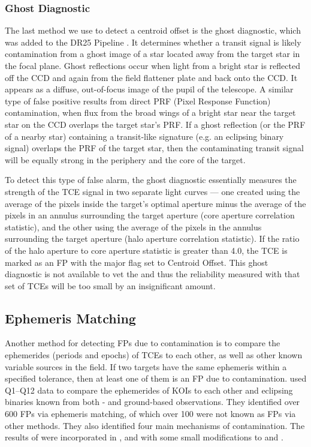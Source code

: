 \subsubsection{Ghost Diagnostic}
\label{s:ghost}
The last method we use to detect a centroid offset is the ghost diagnostic, which was added to the DR25 \kepler{} Pipeline \citep[see \S\,11.3.7 of][]{JenkinsKDPH}. It determines whether a transit signal is likely contamination from a ghost image of a star located away from the target star in the focal plane. Ghost reflections occur when light from a bright star is reflected off the CCD and again from the field flattener plate and back onto the CCD. It appears as a diffuse, out-of-focus image of the pupil of the telescope. A similar type of false positive results from direct PRF (Pixel Response Function) contamination, when flux from the broad wings of a bright star near the target star on the CCD overlaps the target star's PRF.  If a ghost reflection (or the PRF of a nearby star) containing a transit-like signature (e.g. an eclipsing binary signal) overlaps the PRF of the target star, then the contaminating transit signal will be equally strong in the periphery and the core of the target. 

To detect this type of false alarm, the ghost diagnostic essentially measures the strength of the TCE signal in two separate light curves --- one created using the average of the pixels inside the target's optimal aperture minus the average of the pixels in an annulus surrounding the target aperture (core aperture correlation statistic), and the other using the average of the pixels in the annulus surrounding the target aperture (halo aperture correlation statistic). If the ratio of the halo aperture to core aperture statistic is greater than 4.0, the TCE is marked as an FP with the major flag set to Centroid Offset. This ghost diagnostic is not available to vet the  and thus the reliability measured with that set of TCEs will be too small by an insignificant amount.



\subsection{Ephemeris Matching}
\label{ephemmatchsec}
\label{s:ephemmatch}

Another method for detecting FPs due to contamination is to compare the ephemerides (periods and epochs) of TCEs to each other, as well as other known variable sources in the \kepler{} field. If two targets have the same ephemeris within a specified tolerance, then at least one of them is an FP due to contamination. \citet{Coughlin2014a} used Q1--Q12 data to compare the ephemerides of KOIs to each other and eclipsing binaries known from both \kepler{}- and ground-based observations. They identified over 600 FPs via ephemeris matching, of which over 100 were not known as FPs via other methods. They also identified four main mechanisms of contamination. The results of \citet{Coughlin2014a} were incorporated in \citet[][see \S3.3]{Rowe2015a}, and with some small modifications to \citet[][see \S5.3]{Mullally2015cat} and \citet{Coughlin2016}.

